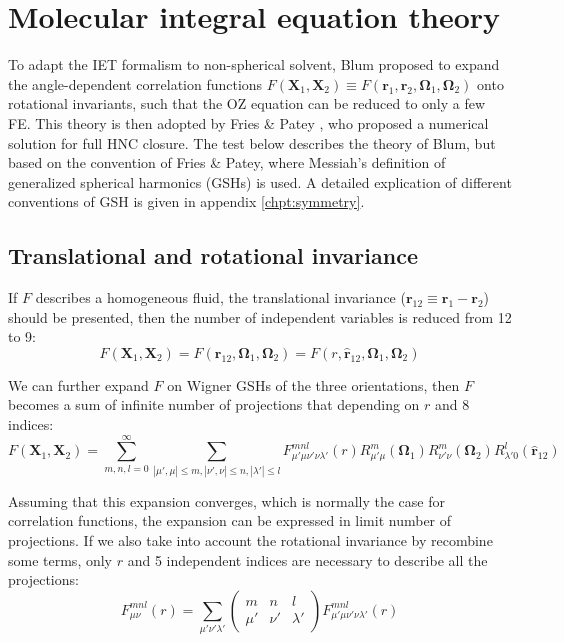 \section{Molecular integral equation theory\label{sec:Angular-dependent-iem}}

To adapt the \acs{IET} formalism to non-spherical solvent, Blum \citep{Blum_I,Blum_II,blum_III}
proposed to expand the angle-dependent correlation functions $F(\mathbf{X}_{1},\mathbf{X}_{2})\equiv F(\mathbf{r}_{1},\mathbf{r}_{2},\mathbf{\Omega}_{1},\mathbf{\Omega}_{2})$
onto rotational invariants, such that the \acs{OZ} equation can be
reduced to only a few \acs{FE}. This theory is then adopted by Fries
\& Patey \citep{Fries_Patey_1985}, who proposed a numerical solution
for full \acs{HNC} closure. The test below describes the theory of
Blum, but based on the convention of Fries \& Patey, where Messiah's
definition of generalized spherical harmonics (\acs{GSH}s) is used.
A detailed explication of different conventions of \acs{GSH} is given
in appendix \ref{chpt:symmetry}.

\subsection{Translational and rotational invariance}

If $F$ describes a homogeneous fluid, the translational invariance
($\mathbf{r}_{12}\equiv\mathbf{r}_{1}-\mathbf{r}_{2}$) should be
presented, then the number of independent variables is reduced from
12 to 9:
\begin{equation}
F(\mathbf{X}_{1},\mathbf{X}_{2})=F(\mathbf{r}_{12},\mathbf{\Omega}_{1},\mathbf{\Omega}_{2})=F(r,\hat{\mathbf{r}}_{12},\mathbf{\Omega}_{1},\mathbf{\Omega}_{2})\label{eq:miet-def-func}
\end{equation}

We can further expand $F$ on Wigner \acs{GSH}s of the three orientations,
then $F$ becomes a sum of infinite number of projections that depending
on $r$ and 8 indices:
\begin{equation}
F(\mathbf{X}_{1},\mathbf{X}_{2})=\sum_{m,n,l=0}^{\infty}\sum_{\left|\mu',\mu\right|\leq m,\left|\nu',\nu\right|\leq n,\left|\lambda'\right|\leq l}F_{\mu'\mu\nu'\nu\lambda'}^{mnl}(r)R_{\mu'\mu}^{m}(\mathbf{\Omega}_{1})R_{\nu'\nu}^{m}(\mathbf{\Omega}_{2})R_{\lambda'0}^{l}(\hat{\mathbf{r}}_{12})
\end{equation}

Assuming that this expansion converges, which is normally the case
for correlation functions, the expansion can be expressed in limit
number of projections. If we also take into account the rotational
invariance by recombine some terms, only $r$ and 5 independent indices
are necessary to describe all the projections:
\begin{equation}
F_{\mu\nu}^{mnl}(r)=\sum_{\mu'\nu'\lambda'}\left(\begin{array}{ccc}
m & n & l\\
\mu' & \nu' & \lambda'
\end{array}\right)F_{\mu'\mu\nu'\nu\lambda'}^{mnl}(r)
\end{equation}

